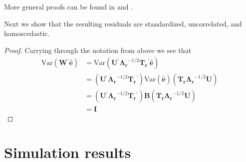 \documentclass[11pt]{article} %
\newcommand{\trans}{\ensuremath{^\prime}}
\newcommand{\var}{\ensuremath{\mathrm{Var}}}
\begin{document}
More general proofs can be found in \cite{McDonald:1979ca} and \cite{deLeeuw:1982to}.

Next we show that the resulting residuals are standardized, uncorrelated, and homoscedastic.

\begin{proof} Carrying through the notation from above we see that
\begin{align*}
\var(\bm{W}\trans \widehat{\bm{e}}) &= \var(\bm{U}\trans \bm{\Lambda_r}^{-1/2} \bm{T_r}\trans \widehat{\bm{e}})\\
&= (\bm{U}\trans \bm{\Lambda_r}^{-1/2} \bm{T_r}\trans) \var(\widehat{\bm{e}}) (\bm{T_r \Lambda_r}^{-1/2} \bm{U})\\
&= (\bm{U}\trans \bm{\Lambda_r}^{-1/2} \bm{T_r}\trans) \bm{B} (\bm{T_r \Lambda_r}^{-1/2} \bm{U})\\
&= \bm{I}
\end{align*}

\end{proof}





\section*{Simulation results}


\end{document}
